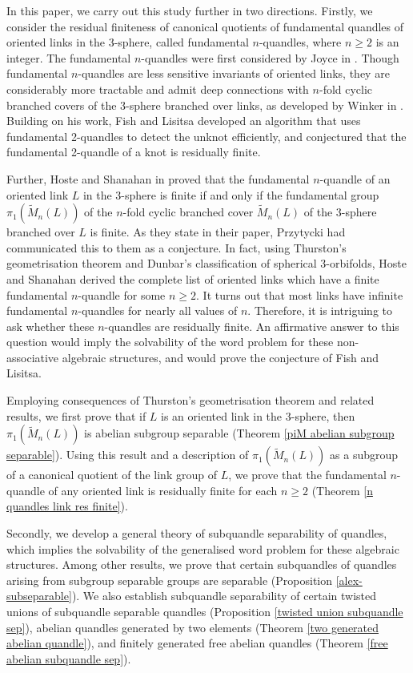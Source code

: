 \documentclass[12pt]{amsart}
\theoremstyle{definition}
\numberwithin{equation}{subsection}
\begin{document}
In this paper, we carry out this study further in two directions. Firstly, we consider the residual finiteness of canonical quotients of fundamental quandles of oriented links in  the 3-sphere, called fundamental $n$-quandles, where $n \ge 2$ is an integer. 
The fundamental $n$-quandles were first considered by Joyce in \cite{Joyce1979}. Though fundamental $n$-quandles are less sensitive invariants of  oriented links, they are considerably more tractable and admit deep connections with $n$-fold cyclic branched covers of the 3-sphere branched over links, as developed by Winker in \cite{MR2634013}. Building on his work, Fish and Lisitsa \cite{Fish-Lisitsa} developed an algorithm that uses fundamental 2-quandles to detect the unknot efficiently, and conjectured that the fundamental 2-quandle of a knot is residually finite. 
\par
Further, Hoste and Shanahan in \cite{MR3704243} proved that the fundamental $n$-quandle of an  oriented  link $L$ in the 3-sphere is finite if and only if the fundamental group $\pi_{1}(\widetilde{M}_{n}(L))$ of the $n$-fold cyclic branched cover $\widetilde{M}_{n}(L)$ of the 3-sphere branched over $L$ is finite. As they state in their paper, Przytycki had communicated this to them as a conjecture. In fact, using Thurston's geometrisation theorem and Dunbar's classification of spherical 3-orbifolds, Hoste and Shanahan derived the complete list of oriented links which have a finite fundamental $n$-quandle for some $n \ge 2$. It turns out that most links have infinite fundamental $n$-quandles for nearly all values of $n$. Therefore, it is intriguing to ask whether these $n$-quandles are residually finite. An affirmative answer to this question would imply the solvability of the word problem for these non-associative algebraic structures, and would prove the conjecture of Fish and Lisitsa.
\par
Employing consequences of Thurston's geometrisation theorem and related results, we first prove that if $L$ is an oriented link in the 3-sphere,  then $\pi_{1}(\widetilde{M}_{n}(L))$ is abelian subgroup separable (Theorem \ref{piM abelian subgroup separable}). Using this result and a description of $\pi_{1}(\widetilde{M}_{n}(L))$ as a subgroup of a canonical quotient of the link group of $L$, we prove that the fundamental $n$-quandle of any oriented link is residually finite for each $n \ge 2$ (Theorem \ref{n quandles link res finite}).  
\par 
Secondly, we develop a general theory of subquandle separability of quandles, which implies the solvability of the generalised word problem for these algebraic structures. Among other results, we prove that certain subquandles of quandles arising from subgroup separable groups are separable (Proposition \ref{alex-subseparable}). We also establish subquandle separability of certain twisted unions of subquandle separable quandles (Proposition \ref{twisted union subquandle sep}), abelian quandles generated by two elements (Theorem \ref{two generated abelian quandle}), and finitely generated free abelian quandles (Theorem \ref{free abelian subquandle sep}).
\medskip
\end{document}
